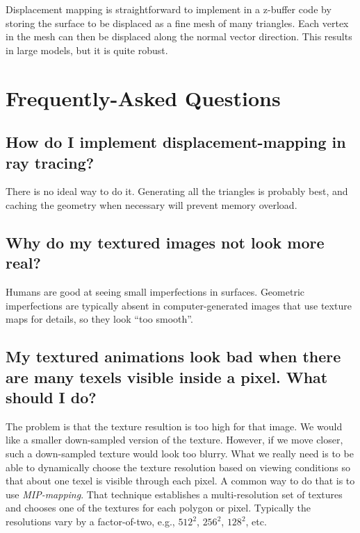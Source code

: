
Displacement mapping is straightforward to implement in
a z-buffer code by 
storing the surface to be displaced as a fine mesh of many
triangles.  Each vertex in the mesh can then be 
displaced along the normal vector direction.  This results
in large models, but it is quite robust.

\section*{Frequently-Asked Questions}

\subsection*{How do I implement displacement-mapping in ray tracing?}

There is no ideal way to do it.  Generating all the triangles
is probably best, and caching the geometry when necessary 
will prevent memory overload.

\subsection*{Why do my textured images not look more real?}

Humans are good at seeing small imperfections in surfaces.
Geometric imperfections are typically absent in computer-generated
images that use texture maps for details, so they look
``too smooth''.

\subsection*{My textured animations look bad when there are many
texels visible inside a pixel.  What should I do?}

The problem is that the texture resultion is too high for that
image.  We would like a smaller down-sampled version of the texture.
However, if we move closer, such a down-sampled texture would
look too blurry.  What we really need is to be able to dynamically
choose the texture resolution based on viewing conditions so that
about one texel is visible through each pixel.  A common way to do 
that is to use 
\emph{MIP-mapping}.
That technique establishes a multi-resolution set of textures and
chooses one of the textures for each polygon or pixel.  Typically
the resolutions vary by a factor-of-two, e.g., $512^2$, 
$256^2$, $128^2$, etc.

